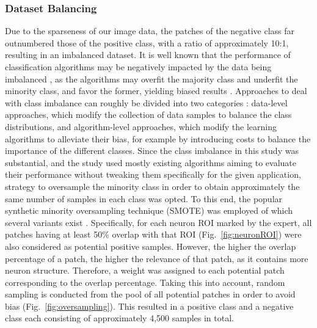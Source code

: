 \subsubsection{Dataset Balancing}
\label{sec:balanced}

Due to the sparseness of our image data, the patches of the negative class far outnumbered those of the positive class, with a ratio of approximately 10:1, resulting in an imbalanced dataset. It is well known that the performance of classification algorithms may be negatively impacted by the data being imbalanced \cite{chawla2004editorial, daskalaki2006evaluation, forman2010apples, branco2016survey}, as the algorithms may overfit the majority class and underfit the minority class, and favor the former, yielding biased results \cite{garcia2014bias, li2018adaptive}. Approaches to deal with class imbalance can roughly be divided into two categories \cite{he2008learning, krawczyk2016learning, haixiang2017learning}: data-level approaches, which modify the collection of data samples to balance the class distributions, and algorithm-level approaches, which modify the learning algorithms to alleviate their bias, for example by introducing costs to balance the importance of the different classes. Since the class imbalance in this study was substantial, and the study used mostly existing algorithms aiming to evaluate their performance without tweaking them specifically for the given application, strategy to oversample the minority class in order to obtain approximately the same number of samples in each class was opted. To this end, the popular synthetic minority oversampling technique (SMOTE) was employed \cite{chawla2002smote} of which several variants exist \cite{saez2015smote, krawczyk2016learning, gosain2017handling}. Specifically, for each neuron ROI marked by the expert, all patches having at least 50\% overlap with that ROI (Fig.~\ref{fig:neuronROI}) were also considered as potential positive samples. However, the higher the overlap percentage of a patch, the higher the relevance of that patch, as it contains more neuron structure. Therefore, a weight was assigned to each potential patch corresponding to the overlap percentage. Taking this into account, random sampling is conducted from the pool of all potential patches in order to avoid bias (Fig.~\ref{fig:oversampling}). This resulted in a positive class and a negative class each consisting of approximately 4,500 samples in total.
